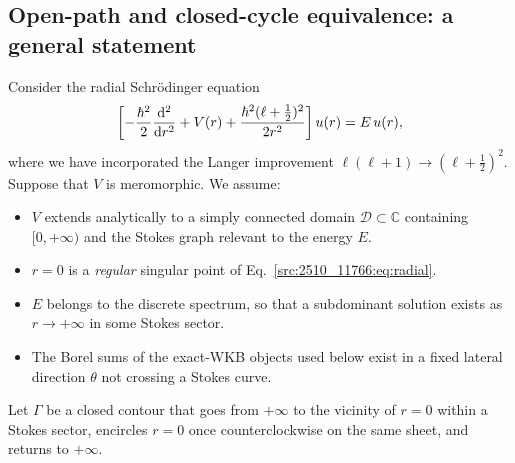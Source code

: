 \subsection{Open-path and closed-cycle equivalence: a general statement}
\label{src:2510_11766:sec:open-closed}
Consider the radial Schr\"odinger equation
\begin{align}
\label{src:2510_11766:eq:radial}
    \left[- \frac{\hbar^2}{2}\frac{\mathrm{d}^2}{\mathrm{d} r^2} + V(r) + \frac{\hbar^2 (\ell+\tfrac12)^2}{2r^2} \right] u(r) = E\,u(r),    
\end{align}
where we have incorporated the Langer improvement $\ell(\ell+1)\to(\ell+\tfrac12)^2$.
Suppose that $V$ is meromorphic. We assume:
\begin{itemize}
\item[(A1)] $V$ extends analytically to a simply connected domain $\mathcal D\subset\mathbb C$ containing $[0,+\infty)$ and the Stokes graph relevant to the energy $E$.
\item[(A2)] $r=0$ is a \textit{regular} singular point of Eq.~\eqref{src:2510_11766:eq:radial}.
\item[(A3)] $E$ belongs to the discrete spectrum, so that a subdominant solution exists as $r\to+\infty$ in some Stokes sector.
\item[(A4)] The Borel sums of the exact-WKB objects used below exist in a fixed lateral direction $\theta$ not crossing a Stokes curve.
\end{itemize}
Let $\Gamma$ be a closed contour that goes from $+\infty$ to the vicinity of $r=0$ within a Stokes sector, encircles $r=0$ once counterclockwise on the same sheet, and returns to $+\infty$.
